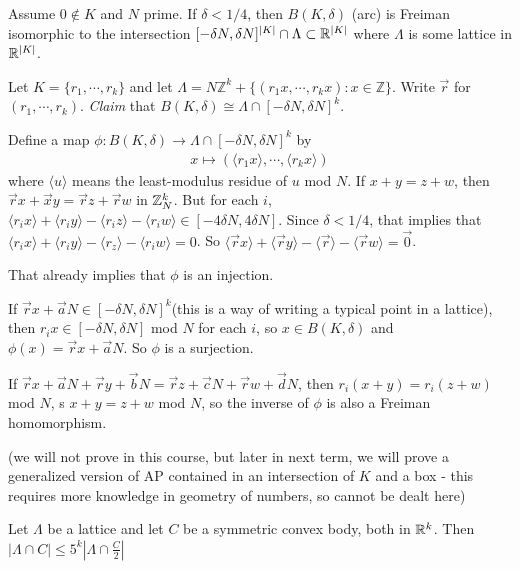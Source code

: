\documentclass[12pt,a4paper]{report}
\newenvironment{proof}
{\begin{changemargin}{1cm}{0.5cm}
	}%
	{\end{changemargin}
}
\begin{document}
 Assume $0 \notin K$ and $N$ prime. If $\delta <1/4$, then $B(K,\delta)$ (arc) is Freiman isomorphic to the intersection $[-\delta N, \delta N]^{|K|} \cap \Lambda \subset \mathbb{R}^{|K|}$ where $\Lambda$ is some lattice in $\mathbb{R}^{|K|}$. 
\begin{proof}
\pf Let $K = \{r_1, \cdots, r_k\}$ and let $\Lambda = N \mathbb{Z}^k + \{(r_1x, \cdots, r_kx) : x\in \mathbb{Z}\}$. Write $\vec{r}$ for $(r_1, \cdots, r_k)$. \emph{Claim} that $B(K,\delta) \cong\Lambda \cap [-\delta N, \delta N]^k$.
\s

\quad Define a map $\phi : B(K,\delta) \rightarrow \Lambda \cap [-\delta N,\delta N]^k$ by
\begin{align*}
x \mapsto (\langle r_1 x\rangle, \cdots, \langle r_k x\rangle)
\end{align*}
where $\langle u\rangle$ means the least-modulus residue of $u$ mod $N$. If $x+ y = z+w$, then $\vec{r} x+ \vec{x} y = \vec{r} z + \vec{r} w$ in $\mathbb{Z}_N^k$. But for each $i$, $\langle r_i x \rangle + \langle r_i y \rangle - \langle r_i z \rangle- \langle r_i w \rangle \in [-4\delta N, 4\delta N]$. Since $\delta < 1/4$, that implies that $\langle r_i x \rangle + \langle r_i y \rangle - \langle r_z \rangle- \langle r_i w \rangle =0$. So $\langle \vec{r} x \rangle + \langle \vec{r} y \rangle - \langle \vec{r} \rangle- \langle \vec{r} w \rangle = \vec{0}$.

\quad That already implies that $\phi$ is an injection.

\quad If $\vec{r} x + \vec{a} N \in [-\delta N, \delta N]^k$(this is a way of writing a typical point in a lattice), then $r_i x \in [-\delta N, \delta N]$ mod $N$ for each $i$, so $x\in B(K,\delta)$ and $\phi(x) = \vec{r}x + \vec{a}N$. So $\phi$ is a surjection.

\quad If $\vec{r} x+ \vec{a} N + \vec{r} y + \vec{b} N = \vec{r} z + \vec{c}N + \vec{ r} w + \vec{d}N$, then $r_i(x+y) = r_i (z+w)$ mod $N$, s $x+y = z+w$ mod $N$, so the inverse of $\phi$ is also a Freiman homomorphism.

\eop 
\end{proof}
\s

(we will not prove in this course, but later in next term, we will prove a generalized version of AP contained in an intersection of $K$ and a box - this requires more knowledge in geometry of numbers, so cannot be dealt here)
\s

 Let $\Lambda$ be a lattice and let $C$ be a symmetric convex body, both in $\mathbb{R}^k$. Then $|\Lambda \cap C | \leq 5^k |\Lambda \cap \frac{C}{2}|$
\end{document}
